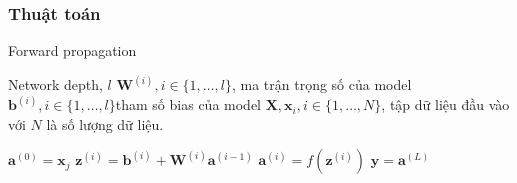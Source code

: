 \subsubsection{ Thuật toán}
\label{subsec:feedforward}
\begin{algorithm}[H]
\caption{Forward propagation }\label{al:forward}
\begin{algorithmic}
\REQUIRE Network depth, $l$
\REQUIRE $\textbf{W}^{(i)}, i \in \{1,\ldots,l\}$, ma trận trọng số của model
\REQUIRE $\textbf{b}^{(i)}, i\in \{1,\ldots,l\}$tham số bias của model
\REQUIRE $\textbf{X}, \textbf{x}_i, i \in \{1,\ldots,N\} $, tập dữ liệu đầu vào với $N$ là số lượng dữ liệu.
	
	\STATE $\textbf{a}^{(0)} = \textbf{x}_j$
		\STATE $\textbf{z}^{(i)}= \textbf{b}^{(i)} + \textbf{W}^{(i)}\textbf{a}^{(i-1)} $
		\STATE $\textbf{a}^{(i)}=f(\textbf{z}^{(i)})$
\ENDFOR
\STATE $\widehat{\textbf{y}} = \textbf{a}^{(L)}$
\ENDFOR
\end{algorithmic}
\end{algorithm}

